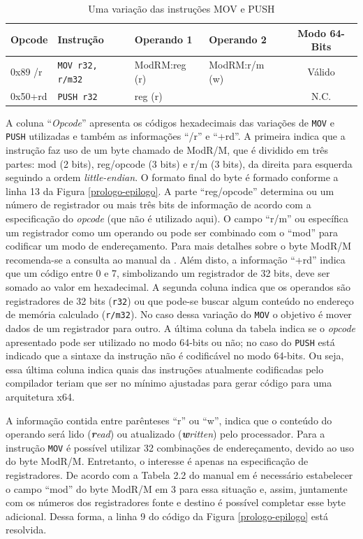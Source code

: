 \begin{table}[ht!]
  \caption{Uma variação das instruções MOV e PUSH\label{mov-push-1}}
  \centering
  \begin{tabular}{l l l l c}
    \toprule
    Opcode  & Instrução     & Operando 1    & Operando 2    &  Modo 64-Bits \\
    \midrule
    0x89 /r & \verb!MOV r32, r/m32!& ModRM:reg (r) & ModRM:r/m (w) &  Válido       \\
    0x50+rd & \verb!PUSH r32!      & reg (r)       &               &  N.C.         \\
    \bottomrule
  \end{tabular}
\end{table}

A coluna ``\textit{Opcode}'' apresenta
os códigos hexadecimais das variações de \verb!MOV! e \verb!PUSH!
utilizadas e também as informações ``/r'' e ``+rd''. A primeira
indica que a instrução faz uso de um byte chamado de ModR/M, que é
dividido em três partes: mod (2 bits),
reg/opcode (3 bits) e r/m (3 bits), da direita para esquerda seguindo
a ordem \textit{little-endian}. O formato final do byte é formado conforme
a linha 13 da Figura \ref{prologo-epilogo}.
A parte ``reg/opcode'' determina ou um
número de registrador ou mais três bits de informação de acordo com
a especificação do \textit{opcode} (que não é utilizado aqui). O campo
``r/m'' ou específica um registrador como um operando ou pode ser
combinado com o ``mod'' para codificar um modo de endereçamento. Para
mais detalhes sobre o byte ModR/M recomenda-se a consulta ao manual da
. Além disto,
a informação ``+rd'' indica que um código entre 0
e 7, simbolizando um registrador de 32 bits, deve ser somado ao valor
em hexadecimal. A segunda coluna indica que os operandos são
registradores de 32 bits (\verb!r32!) ou que pode-se buscar algum
conteúdo no endereço de memória calculado (\verb!r/m32!). No
caso dessa variação do \verb!MOV! o objetivo é mover dados de um
registrador para outro. A última coluna da tabela indica se o
\textit{opcode} apresentado pode ser utilizado no modo 64-bits ou não;
no caso do \verb!PUSH! está indicado que a sintaxe da instrução
não é codificável no modo 64-bits. Ou seja, essa última coluna
indica quais das instruções atualmente codificadas pelo
compilador teriam que ser no mínimo ajustadas para gerar código para
uma arquitetura x64.

A informação contida entre parênteses ``r'' ou ``w'', indica
que o conteúdo do operando será lido
(\textit{\textbf{r}ead}) ou atualizado
(\textit{\textbf{w}ritten}) pelo processador.
 Para a instrução \verb!MOV! é possível utilizar 32 combinações de
endereçamento, devido ao uso do byte ModR/M. Entretanto, o interesse é
apenas na especificação de registradores. De acordo com a
Tabela 2.2 do manual em 
é necessário estabelecer o campo ``mod'' do byte ModR/M em 3 para
essa situação e, assim, juntamente com os números dos registradores fonte e
destino é possível completar esse byte adicional. Dessa forma, a
linha 9 do código da Figura \ref{prologo-epilogo} está resolvida.


